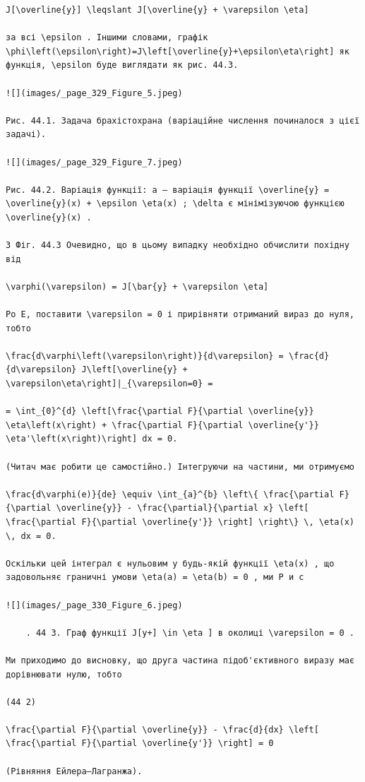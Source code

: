\documentclass[
  ukrainian,
]{article}
\begin{document}
\begin{verbatim}
J[\overline{y}] \leqslant J[\overline{y} + \varepsilon \eta]

за всі \epsilon . Іншими словами, графік \phi\left(\epsilon\right)=J\left[\overline{y}+\epsilon\eta\right] як функція, \epsilon буде виглядати як рис. 44.3.

![](images/_page_329_Figure_5.jpeg)

Рис. 44.1. Задача брахістохрана (варіаційне числення починалося з цієї задачі).

![](images/_page_329_Figure_7.jpeg)

Рис. 44.2. Варіація функції: a — варіація функції \overline{y} = \overline{y}(x) + \epsilon \eta(x) ; \delta є мінімізуючою функцією \overline{y}(x) .

З Фіг. 44.3 Очевидно, що в цьому випадку необхідно обчислити похідну від

\varphi(\varepsilon) = J[\bar{y} + \varepsilon \eta]

Po E, поставити \varepsilon = 0 і прирівняти отриманий вираз до нуля, тобто

\frac{d\varphi\left(\varepsilon\right)}{d\varepsilon} = \frac{d}{d\varepsilon} J\left[\overline{y} + \varepsilon\eta\right]|_{\varepsilon=0} =

= \int_{0}^{d} \left[\frac{\partial F}{\partial \overline{y}} \eta\left(x\right) + \frac{\partial F}{\partial \overline{y'}} \eta'\left(x\right)\right] dx = 0.

(Читач має робити це самостійно.) Інтегруючи на частини, ми отримуємо

\frac{d\varphi(e)}{de} \equiv \int_{a}^{b} \left\{ \frac{\partial F}{\partial \overline{y}} - \frac{\partial}{\partial x} \left[ \frac{\partial F}{\partial \overline{y'}} \right] \right\} \, \eta(x) \, dx = 0.

Оскільки цей інтеграл є нульовим у будь-якій функції \eta(x) , що задовольняє граничні умови \eta(a) = \eta(b) = 0 , ми Р и с

![](images/_page_330_Figure_6.jpeg)

    . 44 3. Граф функції J[y+] \in \eta ] в околиці \varepsilon = 0 .

Ми приходимо до висновку, що друга частина підоб'єктивного виразу має дорівнювати нулю, тобто

(44 2)

\frac{\partial F}{\partial \overline{y}} - \frac{d}{dx} \left[ \frac{\partial F}{\partial \overline{y'}} \right] = 0

(Рівняння Ейлера–Лагранжа).


\end{verbatim}
\end{document}
